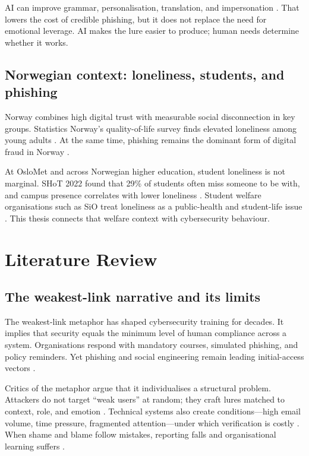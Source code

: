 \documentclass[UKenglish,12pt]{master-style}
\begin{document}
AI can improve grammar, personalisation, translation, and impersonation \parencite{halcyon2026ai,trendmicro2026phishing}. That lowers the cost of credible phishing, but it does not replace the need for emotional leverage. AI makes the lure easier to produce; human needs determine whether it works.

\section{Norwegian context: loneliness, students, and phishing}

Norway combines high digital trust with measurable social disconnection in key groups. Statistics Norway's quality-of-life survey finds elevated loneliness among young adults \parencite{ssb2025loneliness,fhi2024livskvalitet}. At the same time, phishing remains the dominant form of digital fraud in Norway \parencite{nsm2026risk,nkomSvindel}.

At OsloMet and across Norwegian higher education, student loneliness is not marginal. SHoT 2022 found that 29\% of students often miss someone to be with, and campus presence correlates with lower loneliness \parencite{shot2022,khrono2024students}. Student welfare organisations such as SiO treat loneliness as a public-health and student-life issue \parencite{helsedirektoratet2024ensomhet}. This thesis connects that welfare context with cybersecurity behaviour.

\chapter{Literature Review}

\section{The weakest-link narrative and its limits}

The weakest-link metaphor has shaped cybersecurity training for decades. It implies that security equals the minimum level of human compliance across a system. Organisations respond with mandatory courses, simulated phishing, and policy reminders. Yet phishing and social engineering remain leading initial-access vectors \parencite{enisa2024threat,microsoft2024digitaldefense,trendmicro2026phishing}.

Critics of the metaphor argue that it individualises a structural problem. Attackers do not target ``weak users'' at random; they craft lures matched to context, role, and emotion \parencite{hadnagy2018social}. Technical systems also create conditions---high email volume, time pressure, fragmented attention---under which verification is costly \parencite{jts2024remote,parker2020contributing}. When shame and blame follow mistakes, reporting falls and organisational learning suffers \parencite{chen2024roleplaying,baylsmith2024phishing}.
\end{document}
